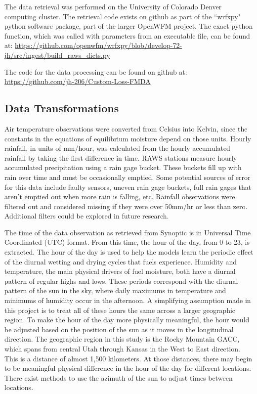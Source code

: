 
The data retrieval was performed on the University of Colorado Denver computing cluster. The retrieval code exists on github as part of the ``wrfxpy" python software package, part of the larger OpenWFM project. The exact python function, which was called with parameters from an executable file, can be found at: \url{https://github.com/openwfm/wrfxpy/blob/develop-72-jh/src/ingest/build_raws_dicts.py}

The code for the data processing can be found on github at: \url{https://github.com/jh-206/Custom-Loss-FMDA}

\subsection*{Data Transformations}

Air temperature observations were converted from Celsius into Kelvin, since the constants in the equations of equilibrium moisture depend on those units. Hourly rainfall, in units of mm/hour, was calculated from the hourly accumulated rainfall by taking the first difference in time. RAWS stations measure hourly accumulated precipitation using a rain gage bucket. These buckets fill up with rain over time and must be occasionally emptied. Some potential sources of error for this data include faulty sensors, uneven rain gage buckets, full rain gages that aren't emptied out when more rain is falling, etc. \cite{Campbell-2017-RMM} Rainfall observations were filtered out and considered missing if they were over 50mm/hr or less than zero. Additional filters could be explored in future research.

The time of the data observation as retrieved from Synoptic is in Universal Time Coordinated (UTC) format. From this time, the hour of the day, from 0 to 23, is extracted. The hour of the day is used to help the models learn the periodic effect of the diurnal wetting and drying cycles that fuels experience. Humidity and temperature, the main physical drivers of fuel moisture, both have a diurnal pattern of regular highs and lows. These periods correspond with the diurnal pattern of the sun in the sky, where daily maximums in temperature and minimums of humidity occur in the afternoon. A simplifying assumption made in this project is to treat all of these hours the same across a larger geographic region. To make the hour of the day more physically meaningful, the hour would be adjusted based on the position of the sun as it moves in the longitudinal direction. The geographic region in this study is the Rocky Mountain GACC, which spans from central Utah through Kansas in the West to East direction. This is a distance of almost 1,500 kilometers. At those distances, there may begin to be meaningful physical difference in the hour of the day for different locations. There exist methods to use the azimuth of the sun to adjust times between locations.

